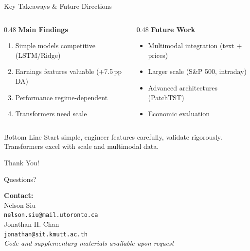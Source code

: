 \documentclass[aspectratio=169,xcolor={dvipsnames}]{beamer}
\begin{document}
\begin{frame}{Key Takeaways \& Future Directions}
  \begin{columns}[T]
    \begin{column}{0.48\textwidth}
      \textbf{Main Findings}
      \begin{enumerate}
        \item Simple models competitive (LSTM/Ridge)
        \item Earnings features valuable (+7.5\,pp DA)
        \item Performance regime-dependent
        \item Transformers need scale
      \end{enumerate}
    \end{column}
    
    \begin{column}{0.48\textwidth}
      \textbf{Future Work}
      \begin{itemize}
        \item Multimodal integration (text + prices)
        \item Larger scale (S\&P 500, intraday)
        \item Advanced architectures (PatchTST)
        \item Economic evaluation
      \end{itemize}
    \end{column}
  \end{columns}
  
  \vspace{0.5cm}
  
  \begin{alertblock}{Bottom Line}
    Start simple, engineer features carefully, validate rigorously. Transformers excel with scale and multimodal data.
  \end{alertblock}
\end{frame}

\begin{frame}[plain]
  \centering
  \vspace{2cm}
  \Huge Thank You!
  
  \vspace{1cm}
  
  \Large Questions?
  
  \vspace{1.5cm}
  
  \normalsize
  \textbf{Contact:}\\[0.3cm]
  Nelson Siu\\
  \texttt{nelson.siu@mail.utoronto.ca}\\[0.5cm]
  
  Jonathan H. Chan\\
  \texttt{jonathan@sit.kmutt.ac.th}\\[0.8cm]
  
  \small
  \textit{Code and supplementary materials available upon request}
\end{frame}
\end{document}
